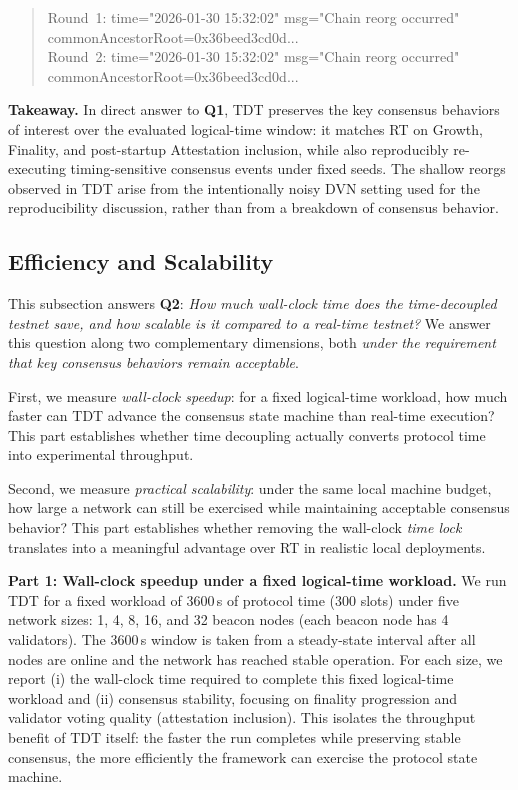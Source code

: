 \begin{quote}
\footnotesize\ttfamily
Round~1: time="2026-01-30 15:32:02" msg="Chain reorg occurred" commonAncestorRoot=0x36beed3cd0d...\\
Round~2: time="2026-01-30 15:32:02" msg="Chain reorg occurred" commonAncestorRoot=0x36beed3cd0d...
\end{quote}

\smallskip\noindent\textbf{Takeaway.}
In direct answer to \textbf{Q1}, TDT preserves the key consensus behaviors of interest over the evaluated logical-time window: it matches RT on Growth, Finality, and post-startup Attestation inclusion, while also reproducibly re-executing timing-sensitive consensus events under fixed seeds. The shallow reorgs observed in TDT arise from the intentionally noisy DVN setting used for the reproducibility discussion, rather than from a breakdown of consensus behavior.

\subsection{Efficiency and Scalability}
\label{subsec:eval_efficiency}

This subsection answers \textbf{Q2}: \emph{How much wall-clock time does the time-decoupled testnet save, and how scalable is it compared to a real-time testnet?} We answer this question along two complementary dimensions, both \emph{under the requirement that key consensus behaviors remain acceptable}.

First, we measure \emph{wall-clock speedup}: for a fixed logical-time workload, how much faster can TDT advance the consensus state machine than real-time execution? This part establishes whether time decoupling actually converts protocol time into experimental throughput.

Second, we measure \emph{practical scalability}: under the same local machine budget, how large a network can still be exercised while maintaining acceptable consensus behavior? This part establishes whether removing the wall-clock \emph{time lock} translates into a meaningful advantage over RT in realistic local deployments.

\smallskip
\noindent\textbf{Part 1: Wall-clock speedup under a fixed logical-time workload.}
We run TDT for a fixed workload of 3600\,s of protocol time (300 slots) under five network sizes: 1, 4, 8, 16, and 32 beacon nodes (each beacon node has 4 validators). The 3600\,s window is taken from a steady-state interval after all nodes are online and the network has reached stable operation.
For each size, we report (i) the wall-clock time required to complete this fixed logical-time workload and (ii) consensus stability, focusing on finality progression and validator voting quality (attestation inclusion). This isolates the throughput benefit of TDT itself: the faster the run completes while preserving stable consensus, the more efficiently the framework can exercise the protocol state machine.

